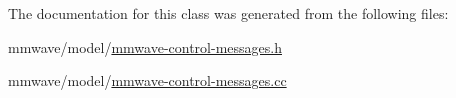 The documentation for this class was generated from the following files\+:\begin{DoxyCompactItemize}
\item 
mmwave/model/\hyperlink{mmwave-control-messages_8h}{mmwave-\/control-\/messages.\+h}\item 
mmwave/model/\hyperlink{mmwave-control-messages_8cc}{mmwave-\/control-\/messages.\+cc}\end{DoxyCompactItemize}
